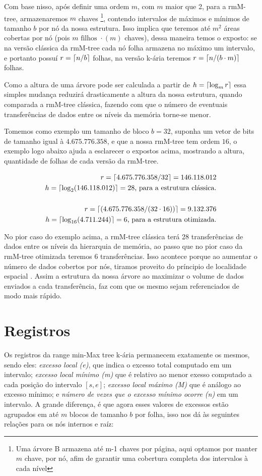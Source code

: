 Com base nisso, após definir uma ordem $m$, com $m$ maior que 2, para a rmM-tree, armazenaremos $m$ chaves  \footnote{Uma árvore B armazena até m-1 chaves por página, aqui optamos por manter $m$ chave,
por nó, afim de garantir uma cobertura completa dos intervalos à cada nível},
contendo intervalos de máximos e mínimos  de tamanho $b$ por nó da nossa estrutura.
Isso implica que teremos até  $m^2$  áreas cobertas por nó  (pois $m \mbox{ filhos } \cdot (m) $ chaves), dessa maneira temos o exposto:
se na versão clássica  da rmM-tree cada nó folha armazena no máximo um intervalo, e portanto possuí $r=\lceil n/b\rceil$ folhas, 
na versão k-ária teremos $r=\lceil n/(b \cdot m)\rceil$ folhas.

Como a altura de uma árvore pode ser calculada a partir de $h = \lceil\log_m r\rceil$ essa simples mudança reduzirá drasticamente a altura da nossa estrutura,
quando comparada a rmM-tree clássica,  fazendo com que o número de eventuais transferências de dados entre os níveis da memória torne-se menor.

Tomemos como exemplo um tamanho de bloco $b = 32$, suponha um vetor de bits de tamanho igual à  $4.675.776.358$, e que a nossa rmM-tree tem ordem $16$, o exemplo logo abaixo
ajuda a esclarecer o expostos acima, mostrando a altura, quantidade de folhas de cada versão da rmM-tree.

\begin{eqnarray*}
    r = \lceil4.675.776.358/32\rceil = 146.118.012 \\
    h = \lceil\log_2(146.118.012)\rceil = 28  \mbox{, para a estrutura clássica}.\\
    \\
    r = \lceil(4.675.776.358/(32 \cdot 16))\rceil = 9.132.376 \\
    h = \lceil\log_{16}(4.711.244)\rceil = 6  \mbox{, para a estrutura otimizada}.
\end{eqnarray*}

No pior caso do exemplo acima, a rmM-tree clássica terá 28 transferências de dados entre os níveis da hierarquia de memória, ao passo que no pior caso da rmM-tree otimizada teremos 6 
transferências. Isso acontece porque ao aumentar o número de dados cobertos por nós, tiramos proveito do príncipio de localidade espacial \citep{book-computer-architecutre}.
Assim a estrutura da nossa árvore ao maximizar o volume de dados enviados a cada transferência, faz com que os mesmo sejam referenciados de modo mais rápido.
\section{Registros}
Os registros da range min-Max tree k-ária permanecem exatamente os mesmos, sendo eles: \textit{excesso local (e)}, que indica o excesso total 
computado em um intervalo; \textit{excesso local mínimo (m)} que é relativo ao menor exesso computado a cada posição do intervalo $[s,e]$;
 \textit{excesso local máximo (M)} que é análogo ao excesso mínimo; e \textit{número de vezes que o excesso mínimo ocorre (n)} em um intervalo. 
 A grande diferença, é que agora esses valores de excessos estão agrupados em até $m$ blocos de tamanho $b$ por folha, isso nos dá às seguintes relações
 para os nós internos e raíz:

